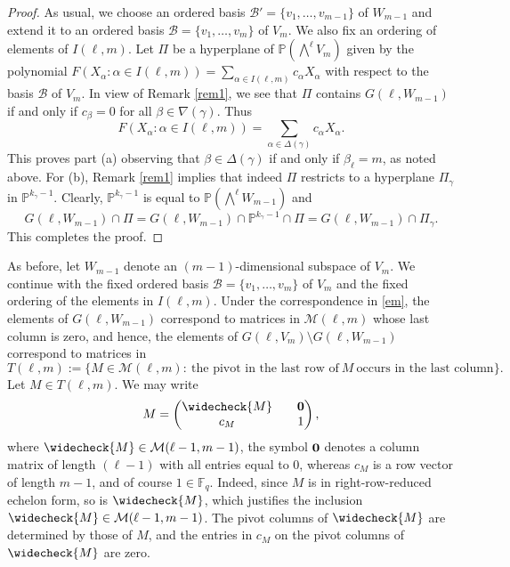 \documentclass[10pt,a4paper,oneside]{amsproc}
\newcommand{\B}{\mathcal{B}}
\newcommand{\Fq}{\mathbb{F}_q}
\newcommand{\M}{\mathcal{M}}
\def\a{{\alpha}}
\def\Fq{{\mathbb F}_q}
\def\PP{{\mathbb P}}
\begin{document}
\begin{proof} 
As usual, we choose an ordered basis $\B' = \{v_1, \dots, v_{m-1}\}$ of $W_{m-1}$ and extend it to an ordered basis $\B = \{v_1, \dots, v_m\}$ of $V_m$. We also fix an ordering of elements of $I(\ell, m)$. Let $\Pi$ be a hyperplane of $\PP\left(\bigwedge^\ell V_m \right)$ given by the polynomial $F(X_\a : \a \in I(\ell, m)) = \displaystyle{\sum_{\a \in I(\ell, m)}} c_\a X_\a$ with respect to the basis $\B$ of $V_m$. In view of Remark \ref{rem1}, we see that $\Pi$  contains $G(\ell, W_{m-1})$ if and only if $c_\beta = 0$ for all $\beta \in \nabla (\gamma)$. Thus 
$$F(X_\a : \a \in I(\ell, m)) = \sum_{\a \in \Delta (\gamma)} c_\a X_\a.$$
This proves part (a) observing that $\beta \in \Delta (\gamma)$ if and only if $\beta_\ell = m$, as noted above. For (b), Remark \ref{rem1} implies that indeed $\Pi$ restricts to a hyperplane $\Pi_\gamma$ in $\PP^{k_{\gamma} - 1}$. Clearly, $\PP^{k_{\gamma} - 1}$ is equal to $\PP \left(\bigwedge^{\ell} W_{m-1} \right)$ and 
$$G(\ell, W_{m-1}) \cap \Pi = G(\ell, W_{m-1}) \cap \PP^{k_{\gamma} -1} \cap \Pi = G(\ell, W_{m-1}) \cap \Pi_\gamma.$$
This completes the proof. 
\end{proof}
As before, let $W_{m-1}$ denote an $(m-1)$-dimensional subspace of $V_m$.  We continue with the fixed ordered basis  $\mathcal{B}= \{v_1, \dots, v_m\}$ of $V_m$ and the fixed ordering of the elements in $I(\ell, m)$. Under the correspondence in \eqref{em}, the elements of  $G(\ell, W_{m-1})$ correspond to matrices in $\M (\ell, m)$ whose last column is zero, and hence, the elements of $G(\ell, V_{m}) \setminus G(\ell, W_{m-1})$ correspond to matrices in  
$$T(\ell, m) := \{M \in \M(\ell, m) : \ \text{the pivot in the last row of} \ M \ \text{occurs in the last column}\}.$$ 
Let $M \in T(\ell, m)$.  We may write
\begin{equation}\label{cm}
    M = \begin{pmatrix}
        \widecheck{M} &&  {\bf 0} \\ 
          c_M && 1
    \end{pmatrix},
\end{equation}
where $\widecheck{M} \in \M(\ell - 1, m-1)$, the symbol ${\bf 0}$ denotes a column matrix of length $(\ell - 1)$ with all entries equal to ${0}$, whereas $c_M$ is a row vector of length $m-1$, and of course $1 \in \Fq$.  Indeed, since $M$ is in right-row-reduced echelon form, so is $\widecheck{M}$, which justifies the inclusion $\widecheck{M} \in \M(\ell - 1, m-1)$. The pivot columns of $\widecheck{M}$ are determined by those of $M$, and the entries in $c_M$ on the pivot columns of $\widecheck{M}$ are zero. 
 
\end{document}
